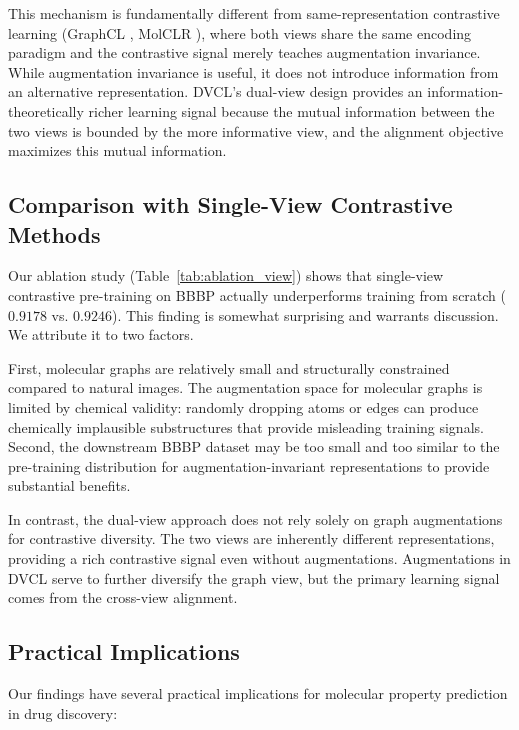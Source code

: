 \documentclass[a4paper,fleqn]{cas-sc}
\begin{document}
This mechanism is fundamentally different from same-representation contrastive learning (GraphCL \citep{you2020graph}, MolCLR \citep{wang2022molclr}), where both views share the same encoding paradigm and the contrastive signal merely teaches augmentation invariance. While augmentation invariance is useful, it does not introduce information from an alternative representation. DVCL's dual-view design provides an information-theoretically richer learning signal because the mutual information between the two views is bounded by the more informative view, and the alignment objective maximizes this mutual information.

\subsection{Comparison with Single-View Contrastive Methods}

Our ablation study (Table~\ref{tab:ablation_view}) shows that single-view contrastive pre-training on BBBP actually underperforms training from scratch ($0.9178$ vs. $0.9246$). This finding is somewhat surprising and warrants discussion. We attribute it to two factors.

First, molecular graphs are relatively small and structurally constrained compared to natural images. The augmentation space for molecular graphs is limited by chemical validity: randomly dropping atoms or edges can produce chemically implausible substructures that provide misleading training signals. Second, the downstream BBBP dataset may be too small and too similar to the pre-training distribution for augmentation-invariant representations to provide substantial benefits.

In contrast, the dual-view approach does not rely solely on graph augmentations for contrastive diversity. The two views are inherently different representations, providing a rich contrastive signal even without augmentations. Augmentations in DVCL serve to further diversify the graph view, but the primary learning signal comes from the cross-view alignment.

\subsection{Practical Implications}

Our findings have several practical implications for molecular property prediction in drug discovery:
\end{document}
